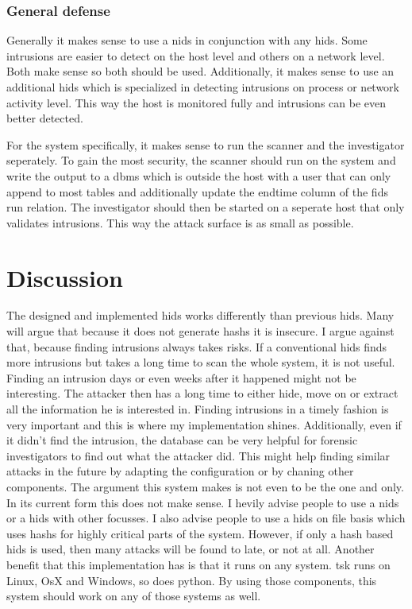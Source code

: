 \documentclass[
	a4paper,					%
	10pt,							%
	twoside,					%
	openright,				%
	notitlepage,			%
	parskip=half,			%
]{scrreprt}					%
\begin{document}
\subsection{General defense}
\label{sec:defense:general}

Generally it makes sense to use a \gls{nids} in conjunction with any \gls{hids}. Some intrusions are easier to detect on the host level and others on a network level. Both make sense so both should be used. Additionally, it makes sense to use an additional \gls{hids} which is specialized in detecting intrusions on process or network activity level. This way the host is monitored fully and intrusions can be even better detected. 

For the system specifically, it makes sense to run the scanner and the investigator seperately. To gain the most security, the scanner should run on the system and write the output to a \gls{dbms} which is outside the host with a user that can only append to most tables and additionally update the endtime column of the fids run relation. The investigator should then be started on a seperate host that only validates intrusions. This way the attack surface is as small as possible. 

\chapter{Discussion}
\label{sec:Discussion}

The designed and implemented \gls{hids} works differently than previous \gls{hids}. Many will argue that because it does not generate \glspl{hash} it is insecure. I argue against that, because finding intrusions always takes risks. If a conventional \gls{hids} finds more intrusions but takes a long time to scan the whole system, it is not useful. Finding an intrusion days or even weeks after it happened might not be interesting. The attacker then has a long time to either hide, move on or extract all the information he is interested in. Finding intrusions in a timely fashion is very important and this is where my implementation shines. Additionally, even if it didn't find the intrusion, the database can be very helpful for forensic investigators to find out what the attacker did. This might help finding similar attacks in the future by adapting the configuration or by chaning other components. The argument this system makes is not even to be the one and only. In its current form this does not make sense. I hevily advise people to use a \gls{nids} or a \gls{hids} with other focusses. I also advise people to use a \gls{hids} on file basis which uses \glspl{hash} for highly critical parts of the system. However, if only a hash based \gls{hids} is used, then many attacks will be found to late, or not at all. Another benefit that this implementation has is that it runs on any system. \gls{tsk} runs on Linux, OsX and Windows, so does python. By using those components, this system should work on any of those systems as well.
\end{document}
